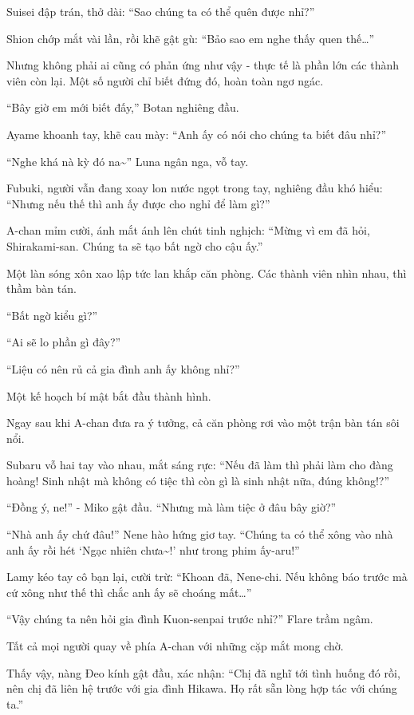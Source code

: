\documentclass[../main.tex]{subfiles}
\begin{document}
Suisei đập trán, thở dài: ``Sao chúng ta có thể quên được nhỉ?''

Shion chớp mắt vài lần, rồi khẽ gật gù: ``Bảo sao em nghe thấy quen thế\dots''

Nhưng không phải ai cũng có phản ứng như vậy - thực tế là phần lớn các thành viên còn lại. Một số người chỉ biết đứng đó, hoàn toàn ngơ ngác.

``Bây giờ em mới biết đấy,'' Botan nghiêng đầu.

Ayame khoanh tay, khẽ cau mày: ``Anh ấy có nói cho chúng ta biết đâu nhỉ?''

``Nghe khá nà kỳ đó na\~{}'' Luna ngân nga, vỗ tay.

Fubuki, người vẫn đang xoay lon nước ngọt trong tay, nghiêng đầu khó hiểu: ``Nhưng nếu thế thì anh ấy được cho nghỉ để làm gì?''

A-chan mỉm cười, ánh mắt ánh lên chút tinh nghịch: ``Mừng vì em đã hỏi, Shirakami-san. Chúng ta sẽ tạo bất ngờ cho cậu ấy.''

Một làn sóng xôn xao lập tức lan khắp căn phòng. Các thành viên nhìn nhau, thì thầm bàn tán.

``Bất ngờ kiểu gì?''

``Ai sẽ lo phần gì đây?''

``Liệu có nên rủ cả gia đình anh ấy không nhỉ?''

Một kế hoạch bí mật bắt đầu thành hình.

\ct

Ngay sau khi A-chan đưa ra ý tưởng, cả căn phòng rơi vào một trận bàn tán sôi nổi.

Subaru vỗ hai tay vào nhau, mắt sáng rực: ``Nếu đã làm thì phải làm cho đàng hoàng! Sinh nhật mà không có tiệc thì còn gì là sinh nhật nữa, đúng không!?''

``Đồng ý, ne!'' - Miko gật đầu. ``Nhưng mà làm tiệc ở đâu bây giờ?''

``Nhà anh ấy chứ đâu!'' Nene hào hứng giơ tay. ``Chúng ta có thể xông vào nhà anh ấy rồi hét `Ngạc nhiên chưa\~{}!' như trong phim ấy-aru!''

Lamy kéo tay cô bạn lại, cười trừ: ``Khoan đã, Nene-chi. Nếu không báo trước mà cứ xông như thế thì chắc anh ấy sẽ choáng mất\dots''

``Vậy chúng ta nên hỏi gia đình Kuon-senpai trước nhỉ?'' Flare trầm ngâm.

Tất cả mọi người quay về phía A-chan với những cặp mắt mong chờ.

Thấy vậy, nàng Đeo kính gật đầu, xác nhận: ``Chị đã nghĩ tới tình huống đó rồi, nên chị đã liên hệ trước với gia đình Hikawa. Họ rất sẵn lòng hợp tác với chúng ta.''
\end{document}
